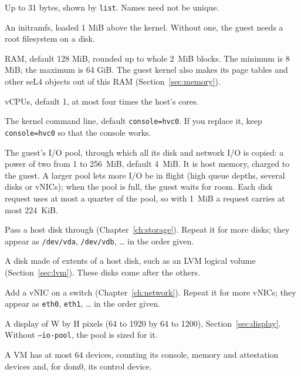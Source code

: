 \documentclass[11pt,a4paper]{report}
\newcommand{\cmd}[1]{\texttt{#1}}
\newcommand{\file}[1]{\texttt{#1}}
\begin{document}
\begin{description}[style=nextline]
  \item[\texttt{NAME}] Up to 31 bytes, shown by \cmd{list}. Names need not
    be unique.
  \item[\texttt{--initrd FILE}] An initramfs, loaded 1 MiB above the
    kernel. Without one, the guest needs a root filesystem on a disk.
  \item[\texttt{--mem MB}] RAM, default 128 MiB, rounded up to whole 2~MiB
    blocks. The minimum is 8 MiB; the maximum is 64 GiB. The guest kernel
    also makes its page tables and other seL4 objects out of this RAM
    (Section~\ref{sec:memory}).
  \item[\texttt{--vcpus N}] vCPUs, default 1, at most four times the host's
    cores.
  \item[\texttt{--cmdline STRING}] The kernel command line, default
    \texttt{console=hvc0}. If you replace it, keep \texttt{console=hvc0} so
    that the console works.

  \item[\texttt{--io-pool MB}] The guest's I/O pool, through which all its
    disk and network I/O is copied: a power of two from 1 to 256~MiB,
    default 4~MiB. It is host memory, charged to the guest. A larger pool
    lets more I/O be in flight (high queue depths, several disks or
    vNICs); when the pool is full, the guest waits for room. Each disk
    request uses at most a quarter of the pool, so with 1~MiB a request
    carries at most 224~KiB.
  \item[\texttt{--disk ...}] Pass a host disk through
    (Chapter~\ref{ch:storage}). Repeat it for more disks; they appear as
    \file{/dev/vda}, \file{/dev/vdb}, \ldots{} in the order given.
  \item[\texttt{--lv ...}, \texttt{--disk ...,extents=}] A disk made of
    extents of a host disk, such as an LVM logical volume
    (Section~\ref{sec:lvm}). These disks come after the others.
  \item[\texttt{--nic ...}] Add a vNIC on a switch
    (Chapter~\ref{ch:network}). Repeat it for more vNICs; they appear as
    \texttt{eth0}, \texttt{eth1}, \ldots{} in the order given.
  \item[\texttt{--gpu WxH}] A display of W by H pixels (64 to 1920 by 64
    to 1200), Section~\ref{sec:display}. Without \texttt{--io-pool}, the
    pool is sized for it.
\end{description}

A VM has at most 64 devices, counting its console, memory and attestation
devices and, for dom0, its control device.
\end{document}
